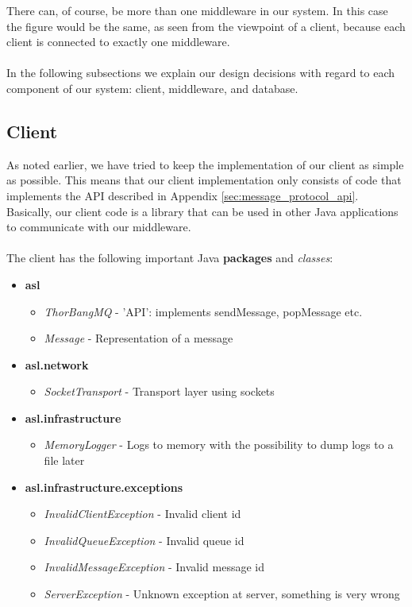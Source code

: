 \documentclass{article}
\begin{document}
         There can, of course, be more than one middleware in our system. In this case the figure would be the same, as seen from the viewpoint of a client, because each client is connected to exactly one middleware.\\
         \\
        In the following subsections we explain our design decisions with regard to each component of our system: client, middleware, and database.

        \subsection{Client}
            As noted earlier, we have tried to keep the implementation of our client as simple as possible. This means that our client implementation only consists of code that implements the API described in Appendix \ref{sec:message_protocol_api}. Basically, our client code is a library that can be used in other Java applications to communicate with our middleware.\\
            \\
            The client has the following important Java \textbf{packages} and \textit{classes}:
            \begin{itemize}
                \item \textbf{asl}
                    \begin{itemize}
                        \item \textit{ThorBangMQ} - 'API': implements sendMessage, popMessage etc.
                        \item \textit{Message} - Representation of a message
                    \end{itemize}
                \item \textbf{asl.network}
                \begin{itemize}
                     \item \textit{SocketTransport} - Transport layer using sockets
                 \end{itemize} 
                \item \textbf{asl.infrastructure}
                 \begin{itemize}
                    \item \textit{MemoryLogger} - Logs to memory with the possibility to dump logs to a file later
                \end{itemize}
                \item \textbf{asl.infrastructure.exceptions}
                \begin{itemize}
                    \item \textit{InvalidClientException} - Invalid client id
                    \item \textit{InvalidQueueException} - Invalid queue id
                    \item \textit{InvalidMessageException} - Invalid message id
                    \item \textit{ServerException} - Unknown exception at server, something is very wrong
                \end{itemize}
            \end{itemize}
\end{document}
